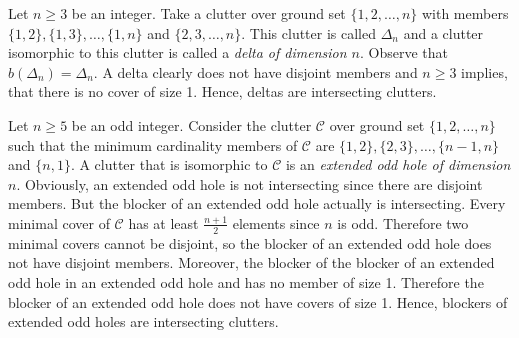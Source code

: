 \documentclass[a4paper, 12pt]{scrbook}
\theoremstyle{definition}
\begin{document}
    \begin{figure}[b]
        \centering
        \begin{minipage}{.4\textwidth}
            \centering
        \end{minipage}
        \begin{minipage}{.4\textwidth}
            \centering
        \end{minipage}
    \end{figure}


Let $n \geq 3$ be an integer.
Take a clutter over ground set $\{1,2,\ldots,n\}$ with members $\{1,2\},\{1,3\},\ldots,\{1,n\}$ and $\{2,3,\ldots,n\}$.
This clutter is called $\Delta_n$ and a clutter isomorphic to this clutter is called a \emph{delta of dimension $n$}\cite{deltadefinition}.
Observe that $b(\Delta_n)=\Delta_n$.
A delta clearly does not have disjoint members and $n\geq 3$ implies, that there is no cover of size 1.
Hence, deltas are intersecting clutters.

Let $n\geq 5$ be an odd integer.
Consider the clutter $\mathcal{C}$ over ground set $\{1,2,\ldots,n\}$ such that the minimum cardinality members of $\mathcal{C}$ are $\{1,2\},\{2,3\},\ldots,\{n-1,n\}$ and $\{n,1\}$.
A clutter that is isomorphic to $\mathcal{C}$ is an \emph{extended odd hole of dimension $n$}\cite{deltas}.
Obviously, an extended odd hole is not intersecting since there are disjoint members.
But the blocker of an extended odd hole actually is intersecting.
Every minimal cover of $\mathcal{C}$ has at least $\frac{n+1}2$ elements since $n$ is odd.
Therefore two minimal covers cannot be disjoint, so the blocker of an extended odd hole does not have disjoint members.
Moreover, the blocker of the blocker of an extended odd hole in an extended odd hole and has no member of size 1.
Therefore the blocker of an extended odd hole does not have covers of size 1.
Hence, blockers of extended odd holes are intersecting clutters.\\
\end{document}
